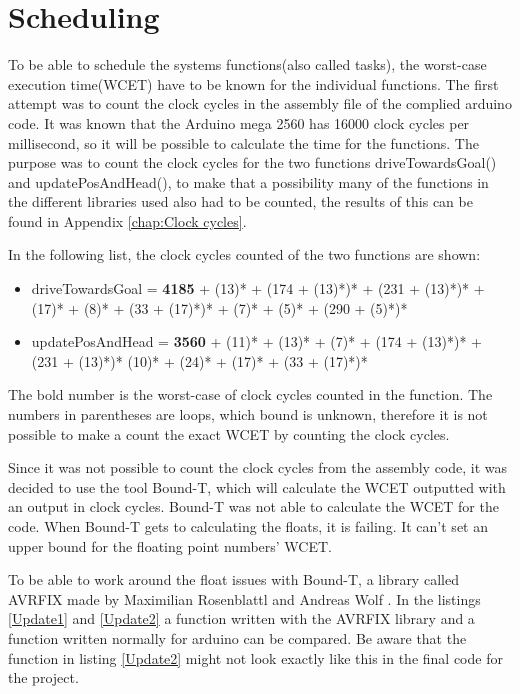 \section{Scheduling}
\label{sec:Scheduling implementation}
To be able to schedule the systems functions(also called tasks), the worst-case execution time(WCET) have to be known for the individual functions. The first attempt was to count the clock cycles in the assembly file of the complied arduino code. It was known that the Arduino mega 2560 has 16000 clock cycles per millisecond, so it will be possible to calculate the time for the functions. The purpose was to count the clock cycles for the two functions driveTowardsGoal() and updatePosAndHead(), to make that a possibility many of the functions in the different libraries used also had to be counted, the results of this can be found in Appendix \ref{chap:Clock cycles}.

In the following list, the clock cycles counted of the two functions are shown:
\begin{itemize}
	\item driveTowardsGoal = \textbf{4185} + (13)* + (174 + (13)*)* + (231 + (13)*)* + (17)* + (8)* + (33 + (17)*)* + (7)* + (5)* + (290 + (5)*)*
	\item updatePosAndHead = \textbf{3560} + (11)* + (13)* + (7)* + (174 + (13)*)* + (231 + (13)*)* (10)* + (24)* + (17)* + (33 + (17)*)*
\end{itemize}
The bold number is the worst-case of clock cycles counted in the function. The numbers in parentheses are loops, which bound is unknown, therefore it is not possible to make a count the exact WCET by counting the clock cycles.

Since it was not possible to count the clock cycles from the assembly code, it was decided to use the tool Bound-T, which will calculate the WCET outputted with an output in clock cycles. \newline
Bound-T was not able to calculate the WCET for the code. When Bound-T gets to calculating the floats, it is failing. It can't set an upper bound for the floating point numbers' WCET.

To be able to work around the float issues with Bound-T, a library called AVRFIX made by Maximilian Rosenblattl and Andreas Wolf \citep{AVRFIX}. In the listings \ref{Update1} and \ref{Update2} a function written with the AVRFIX library and a function written normally for arduino can be compared. Be aware that the function in listing \ref{Update2} might not look exactly like this in the final code for the project. 

